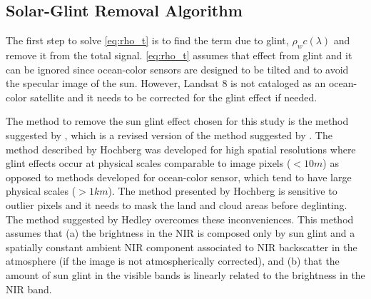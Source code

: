 \subsection{Solar-Glint Removal Algorithm}
The first step to solve \autoref{eq:rho_t} is to find the term due to glint, $\rho_wc(\lambda)$ and remove it from the total signal. \autoref{eq:rho_t} assumes that effect from glint and it can be ignored since ocean-color sensors are designed to be tilted and to avoid the specular image of the sun. However, Landsat 8 is not cataloged as an ocean-color satellite and it needs to be corrected for the glint effect if needed.

The method to remove the sun glint effect chosen for this study is the method suggested by \cite{Hedley:2005}, which is a revised version of the method suggested by \cite{Hochberg:2003}. The method described by Hochberg was developed for high spatial resolutions where glint effects occur at physical scales comparable to image pixels ($<10m$) as opposed to methods developed for ocean-color sensor, which tend to have large physical scales ($>1km$).
The method presented by Hochberg is sensitive to outlier pixels and it needs to mask the land and cloud areas before deglinting. The method suggested by Hedley overcomes these inconveniences. This method assumes that (a) the brightness in the NIR is composed only by sun glint and a spatially constant ambient NIR component associated to NIR backscatter in the atmosphere (if the image is not atmospherically corrected), and (b) that the amount of sun glint in the visible bands is linearly related to the brightness in the NIR band. 

